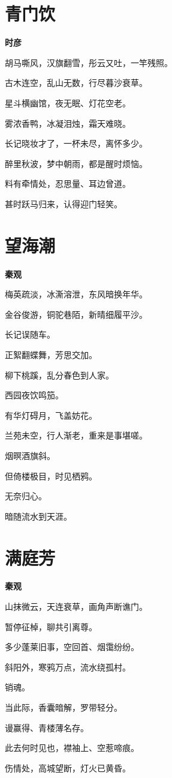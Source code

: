 \documentclass[12pt,a4paper]{ctexbook}
\begin{document}
\section{青门饮}
\textbf{时彦}\par\vspace{0.5em}
胡马嘶风，汉旗翻雪，彤云又吐，一竿残照。\par
古木连空，乱山无数，行尽暮沙衰草。\par
星斗横幽馆，夜无眠、灯花空老。\par
雾浓香鸭，冰凝泪烛，霜天难晓。\par
长记晓妆才了，一杯未尽，离怀多少。\par
醉里秋波，梦中朝雨，都是醒时烦恼。\par
料有牵情处，忍思量、耳边曾道。\par
甚时跃马归来，认得迎门轻笑。\par

\section{望海潮}
\textbf{秦观}\par\vspace{0.5em}
梅英疏淡，冰澌溶泄，东风暗换年华。\par
金谷俊游，铜驼巷陌，新晴细履平沙。\par
长记误随车。\par
正絮翻蝶舞，芳思交加。\par
柳下桃蹊，乱分春色到人家。\par
西园夜饮鸣笳。\par
有华灯碍月，飞盖妨花。\par
兰苑未空，行人渐老，重来是事堪嗟。\par
烟暝酒旗斜。\par
但倚楼极目，时见栖鸦。\par
无奈归心。\par
暗随流水到天涯。\par

\section{满庭芳}
\textbf{秦观}\par\vspace{0.5em}
山抹微云，天连衰草，画角声断谯门。\par
暂停征棹，聊共引离尊。\par
多少蓬莱旧事，空回首、烟霭纷纷。\par
斜阳外，寒鸦万点，流水绕孤村。\par
销魂。\par
当此际，香囊暗解，罗带轻分。\par
谩赢得、青楼薄名存。\par
此去何时见也，襟袖上、空惹啼痕。\par
伤情处，高城望断，灯火已黄昏。\par
\end{document}

